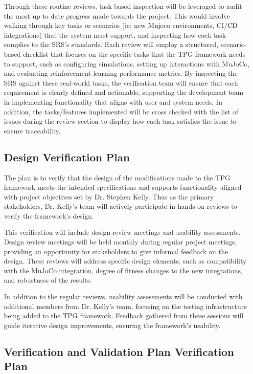 \documentclass[12pt, titlepage]{article}
\begin{document}
Through these routine reviews, task based inspection will be leveraged to audit the most up to date progress made towards the project. This would involve walking through key tasks or scenarios (ie: new Mujoco environments, CI/CD integrations) that the system must support, and inspecting how each task complies to the SRS’s standards. Each review will employ a structured, scenario-based checklist that focuses on the specific tasks that the TPG framework needs to support, such as configuring simulations, setting up interactions with MuJoCo, and evaluating reinforcement learning performance metrics. By inspecting the SRS against these real-world tasks, the verification team will ensure that each requirement is clearly defined and actionable, supporting the development team in implementing functionality that aligns with user and system needs. In addition, the tasks/features implemented will be cross checked with the list of issues during the review section to display how each task satisfies the issue to ensure traceability.


\subsection{Design Verification Plan}

The plan is to verify that the design of the modifications made to the TPG framework meets the intended specifications and supports functionality aligned with project objectives set by Dr. Stephen Kelly. Thus as the primary stakeholders, Dr. Kelly’s team will actively participate in hands-on reviews to verify the framework's design.

This verification will include design review meetings and usability assessments. Design review meetings will be held monthly during regular project meetings, providing an opportunity for stakeholders to give informal feedback on the design. These reviews will address specific design elements, such as compatibility with the MuJoCo integration, degree of fitness changes to the new integrations, and robustness of the results.

In addition to the regular reviews, usability assessments will be conducted with additional members from Dr. Kelly's team, focusing on the testing infrastructure being added to the TPG framework. Feedback gathered from these sessions will guide iterative design improvements, ensuring the framework’s usability.


\subsection{Verification and Validation Plan Verification Plan}
\end{document}

